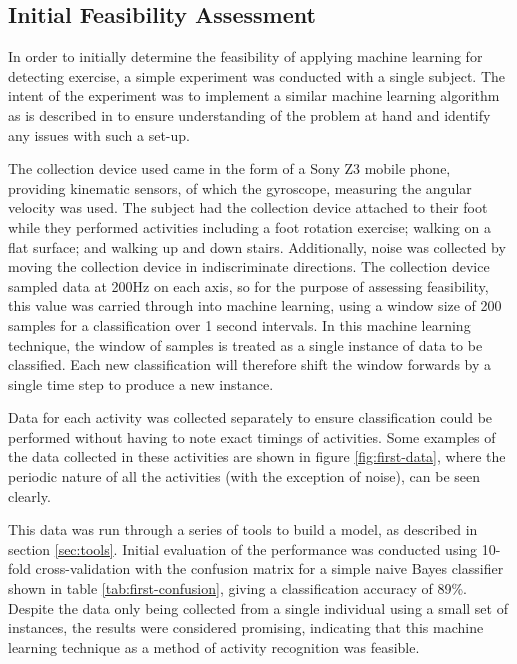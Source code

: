 \subsection{Initial Feasibility Assessment}
In order to initially determine the feasibility of applying machine learning for detecting exercise, a simple experiment was conducted with a single subject. The intent of the experiment was to implement a similar machine learning algorithm as is described in \cite{kwapisz2011activity} to ensure understanding of the problem at hand and identify any issues with such a set-up.

The collection device used came in the form of a Sony Z3 mobile phone, providing kinematic sensors, of which the gyroscope, measuring the angular velocity was used. The subject had the collection device attached to their foot while they performed activities including a foot rotation exercise; walking on a flat surface; and walking up and down stairs. Additionally, noise was collected by moving the collection device in indiscriminate directions. The collection device sampled data at 200Hz on each axis, so for the purpose of assessing feasibility, this value was carried through into machine learning, using a window size of 200 samples for a classification over 1 second intervals. In this machine learning technique, the window of samples is treated as a single instance of data to be classified. Each new classification will therefore shift the window forwards by a single time step to produce a new instance.

Data for each activity was collected separately to ensure classification could be performed without having to note exact timings of activities. Some examples of the data collected in these activities are shown in figure \ref{fig:first-data}, where the periodic nature of all the activities (with the exception of noise), can be seen clearly.

This data was run through a series of tools to build a model, as described in section \ref{sec:tools}. Initial evaluation of the performance was conducted using 10-fold cross-validation with the confusion matrix for a simple naive Bayes classifier shown in table \ref{tab:first-confusion}, giving a classification accuracy of 89\%. Despite the data only being collected from a single individual using a small set of instances, the results were considered promising, indicating that this machine learning technique as a method of activity recognition was feasible.

